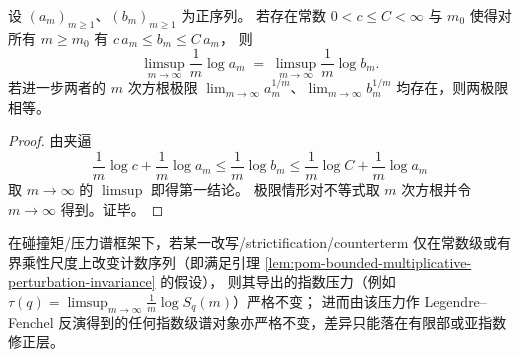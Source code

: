 \begin{lemma}[有界乘性扰动不变性]\label{lem:pom-bounded-multiplicative-perturbation-invariance}
设 \((a_m)_{m\ge 1}\)、\((b_m)_{m\ge 1}\) 为正序列。
若存在常数 \(0<c\le C<\infty\) 与 \(m_0\) 使得对所有 \(m\ge m_0\) 有
\(
c\,a_m\le b_m\le C\,a_m
\)，
则
\[
\limsup_{m\to\infty}\frac{1}{m}\log a_m
\;=\;
\limsup_{m\to\infty}\frac{1}{m}\log b_m.
\]
若进一步两者的 \(m\) 次方根极限 \(\lim_{m\to\infty}a_m^{1/m}\)、\(\lim_{m\to\infty}b_m^{1/m}\) 均存在，则两极限相等。
\end{lemma}
\begin{proof}
由夹逼
\[
\frac{1}{m}\log c+\frac{1}{m}\log a_m
\le
\frac{1}{m}\log b_m
\le
\frac{1}{m}\log C+\frac{1}{m}\log a_m
\]
取 \(m\to\infty\) 的 \(\limsup\) 即得第一结论。
极限情形对不等式取 \(m\) 次方根并令 \(m\to\infty\) 得到。证毕。
\end{proof}

\begin{corollary}[压力谱与大偏差谱的稳定性原则]\label{cor:pom-pressure-stability-under-bounded-perturbation}
在碰撞矩/压力谱框架下，若某一改写/strictification/counterterm 仅在常数级或有界乘性尺度上改变计数序列（即满足引理 \ref{lem:pom-bounded-multiplicative-perturbation-invariance} 的假设），
则其导出的指数压力（例如 \(\tau(q)=\limsup_{m\to\infty}\frac{1}{m}\log S_q(m)\)）严格不变；
进而由该压力作 Legendre--Fenchel 反演得到的任何指数级谱对象亦严格不变，差异只能落在有限部或亚指数修正层。
\end{corollary}
